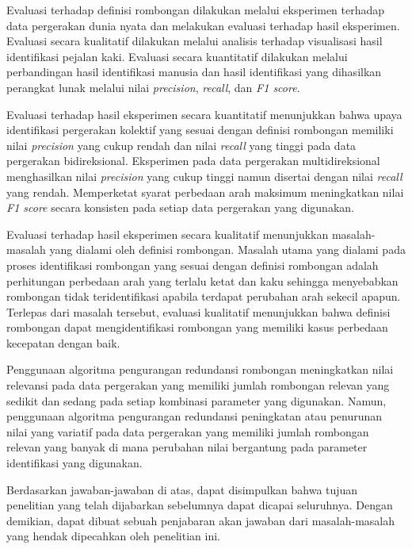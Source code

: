 \begin{enumerate}
    Evaluasi terhadap definisi rombongan dilakukan melalui eksperimen terhadap data pergerakan dunia nyata dan melakukan evaluasi terhadap hasil eksperimen. Evaluasi secara kualitatif dilakukan melalui analisis terhadap visualisasi hasil identifikasi pejalan kaki. Evaluasi secara kuantitatif dilakukan melalui perbandingan hasil identifikasi manusia dan hasil identifikasi yang dihasilkan perangkat lunak melalui nilai \textit{precision}, \textit{recall}, dan \textit{F1 score}.
    
    Evaluasi terhadap hasil eksperimen secara kuantitatif menunjukkan bahwa upaya identifikasi pergerakan kolektif yang sesuai dengan definisi rombongan memiliki nilai \textit{precision} yang cukup rendah dan nilai \textit{recall} yang tinggi pada data pergerakan bidireksional. Eksperimen pada data pergerakan multidireksional menghasilkan nilai \textit{precision} yang cukup tinggi namun disertai dengan nilai \textit{recall} yang rendah. Memperketat syarat perbedaan arah maksimum meningkatkan nilai \textit{F1 score} secara konsisten pada setiap data pergerakan yang digunakan.
    
    Evaluasi terhadap hasil eksperimen secara kualitatif menunjukkan masalah-masalah yang dialami oleh definisi rombongan. Masalah utama yang dialami pada proses identifikasi rombongan yang sesuai dengan definisi rombongan adalah perhitungan perbedaan arah yang terlalu ketat dan kaku sehingga menyebabkan rombongan tidak teridentifikasi apabila terdapat perubahan arah sekecil apapun. Terlepas dari masalah tersebut, evaluasi kualitatif menunjukkan bahwa definisi rombongan dapat mengidentifikasi rombongan yang memiliki kasus perbedaan kecepatan dengan baik.
    
    Penggunaan algoritma pengurangan redundansi rombongan meningkatkan nilai relevansi pada data pergerakan yang memiliki jumlah rombongan relevan yang sedikit dan sedang pada setiap kombinasi parameter yang digunakan. Namun, penggunaan algoritma pengurangan redundansi peningkatan atau penurunan nilai yang variatif pada data pergerakan yang memiliki jumlah rombongan relevan yang banyak di mana perubahan nilai bergantung pada parameter identifikasi yang digunakan.
\end{enumerate}

Berdasarkan jawaban-jawaban di atas, dapat disimpulkan bahwa tujuan penelitian yang telah dijabarkan sebelumnya dapat dicapai seluruhnya. Dengan demikian, dapat dibuat sebuah penjabaran akan jawaban dari masalah-masalah yang hendak dipecahkan oleh penelitian ini.

